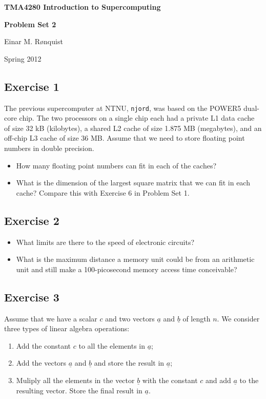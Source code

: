 \documentclass[11pt]{article}
\begin{document}
\centerline{\LARGE\textbf{TMA4280 Introduction to Supercomputing}}

\vspace*{5ex}

\centerline{\Large\textbf{Problem Set 2}}

\large

\vspace*{8ex}
\centerline{Einar M. R{\o}nquist}

\vspace*{4ex}
\centerline{Spring 2012}

\subsection*{Exercise 1}

The previous supercomputer at NTNU, \texttt{njord}, was based on the 
POWER5 dual-core chip. The two processors on a single chip
each had a private L1 data cache of size 32 kB (kilobytes), 
a shared L2 cache of size 1.875 MB (megabytes), and an off-chip L3 cache 
of size 36 MB. Assume that we need to store floating 
point numbers in double precision. 
\begin{itemize}
\item How many floating point numbers 
can fit in each of the caches?
\item What is the dimension of the largest square matrix that 
we can fit in each cache? Compare this with Exercise 6  in Problem Set 1. 
\end{itemize}


\subsection*{Exercise 2}
\begin{itemize}
\item What limits are there to the speed of electronic circuits?
\item What is the maximum distance a memory unit could be from an
    arithmetic unit and still make a 100-picosecond memory access time
    conceivable?
\end{itemize}

\subsection*{Exercise 3}
Assume that we have a scalar $c$ and two vectors 
$\underline{a}$ and $\underline{b}$ of length $n$.
We consider three types of linear algebra operations: 
\begin{enumerate}
\item Add the constant $c$ to all the elements in $\underline{a}$;
\item Add the vectors $\underline{a}$ and $\underline{b}$ and store
  the result in $\underline{a}$;
\item Muliply all the elements in the vector $\underline{b}$ with the 
constant $c$ and add $\underline{a}$ to the resulting vector. 
Store the final result in $\underline{a}$.
\end{enumerate}
\end{document}
